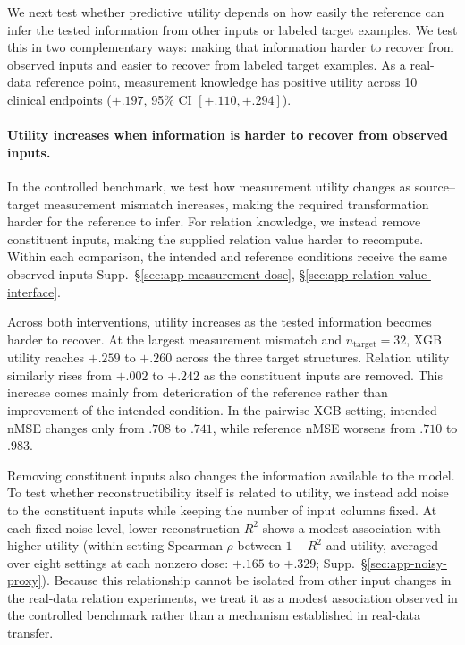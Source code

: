 \documentclass{article} %
\newcommand{\supp}[1]{\textnormal{Supp.~#1}}
\begin{document}
We next test whether predictive utility depends on how easily the reference can infer the tested information from other inputs or labeled target examples.
We test this in two complementary ways: making that information harder to recover from observed inputs and easier to recover from labeled target examples.
As a real-data reference point, measurement knowledge has positive utility across 10 clinical endpoints ($+.197$, 95\% CI $[+.110,+.294]$).

\paragraph{Utility increases when information is harder to recover from observed inputs.}

In the controlled benchmark, we test how measurement utility changes as source--target measurement mismatch increases, making the required transformation harder for the reference to infer.
For relation knowledge, we instead remove constituent inputs, making the supplied relation value harder to recompute.
Within each comparison, the intended and reference conditions receive the same observed inputs \supp{\S\ref{sec:app-measurement-dose}, \S\ref{sec:app-relation-value-interface}}.

Across both interventions, utility increases as the tested information becomes harder to recover.
At the largest measurement mismatch and $n_{\mathrm{target}}=32$, XGB utility reaches $+.259$ to $+.260$ across the three target structures.
Relation utility similarly rises from $+.002$ to $+.242$ as the constituent inputs are removed.
This increase comes mainly from deterioration of the reference rather than improvement of the intended condition.
In the pairwise XGB setting, intended nMSE changes only from $.708$ to $.741$, while reference nMSE worsens from $.710$ to $.983$.

Removing constituent inputs also changes the information available to the model. To test whether reconstructibility itself is related to utility, we instead add noise to the constituent inputs while keeping the number of input columns fixed.
At each fixed noise level, lower reconstruction $R^2$ shows a modest association with higher utility (within-setting Spearman $\rho$ between $1-R^2$ and utility, averaged over eight settings at each nonzero dose: $+.165$ to $+.329$; \supp{\S\ref{sec:app-noisy-proxy}}).
Because this relationship cannot be isolated from other input changes in the real-data relation experiments, we treat it as a modest association observed in the controlled benchmark rather than a mechanism established in real-data transfer.
\end{document}
